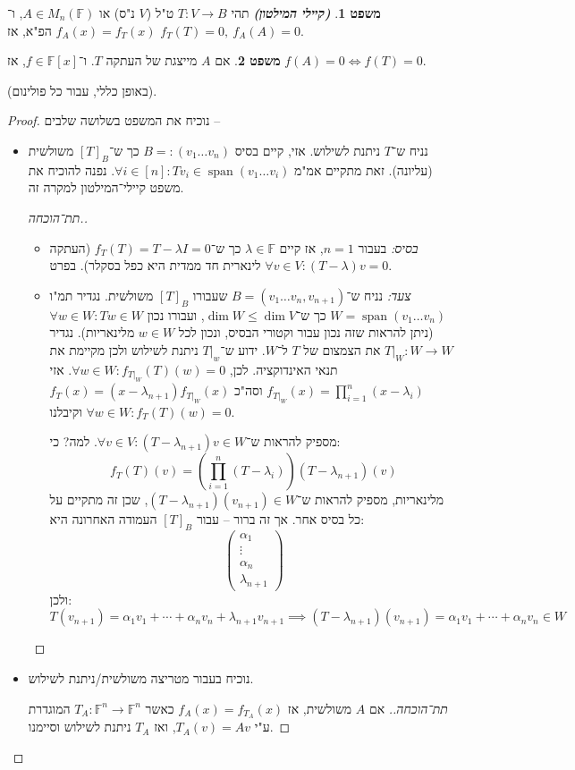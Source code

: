 \documentclass[a4paper]{article}
\DeclareMathOperator{\Sp}      {span}
\newcommand\F         {\mathbb{F}}
\newcommand\co        {\colon}
\newcommand\pms[1]    {\begin{pmatrix}
		#1
\end{pmatrix}}
\newcommand\ag        {\alpha}
\renewcommand\lg      {\lambda}
\newcommand\cl [1]    {\left ( #1 \right )}
\theoremstyle{definition}
\newtheorem{Theorem}{משפט}
\newcommand\theo  [1] {\begin{Theorem}#1\end{Theorem}}
\begin{document}
	\begin{Theorem}
		\textbf{\textit{(קיילי המילטון)}} תהי $T \co V \to B$ ט"ל ($V$ נ"ס) או $A \in M_n(\F)$, ו־$f_A(x) = f_T(x)$ הפ"א, אז $f_T(T) = 0, \ f_A(A) = 0$. 
	\end{Theorem}
	\theo{אם $A$ מייצגת של העתקה $T$. ו־$f \in \F[x]$, אז $f(A) = 0 \iff f(T) = 0$. }
	(באופן כללי, עבור כל פולינום). 
	
	\begin{proof}
		נוכיח את המשפט בשלושה שלבים – 
		\begin{itemize}
			\item נניח ש־$T$ ניתנת לשילוש. אזי, קיים בסיס $B =: (v_1 \dots v_n)$ כך ש־$[T]_B$ משולשית (עליונה). זאת מתקיים אמ"מ $\forall i \in [n] \co Tv_i \in \Sp(v_1 \dots v_i)$. נפנה להוכיח את משפט קיילי־המילטון למקרה זה. 
			
			\begin{proof}[תת־הוכחה.]\,
				\begin{itemize}
					\item \textit{בסיס:} בעבור $n = 1$, אז קיים $\lg \in \F$ כך ש־$f_T(T) = T - \lg I = 0$ (העתקה לינארית חד ממדית היא כפל בסקלר). בפרט $\forall v \in V \co (T - \lg)v = 0$. 
					\item \textit{צעד:} נניח ש־$B = (v_1 \dots v_n, v_{n + 1})$ שעבורו $[T]_B$ משולשית. נגדיר תמ"ו $W = \Sp(v_1 \dots v_n)$ כך ש־$\dim W \le \dim V$, ועבורו נכון $\forall w \in W \co Tw \in W$ (ניתן להראות שזה נכון עבור וקטורי הבסיס, ונכון לכל $w \in W$ מלינאריות). נגדיר $T|_W \co W \to W$ את הצמצום של $T$ ל־$W$. ידוע ש־$T|_w$ ניתנת לשילוש ולכן מקיימת את תנאי האינדוקציה. לכן, $\forall w \in W\co f_{T|_W}(T)(w) = 0$. אזי $f_{T|_W}(x) = \prod_{i = 1}^{n}(x - \lg_i)$ וסה"כ $f_{T}(x) = (x - \lg_{n + 1})f_{T|_W}(x)$ וקיבלנו $\forall w \in W \co f_T(T)(w) = 0$. 
					
					מספיק להראות ש־$\forall v \in V \co (T - \lg_{n + 1})v \in W$. למה? כי: 
					\[ f_T(T)(v) = \cl{\prod_{i = 1}^{n}(T - \lg_i)}(T - \lg_{n + 1})(v) \]
					מלינאריות, מספיק להראות ש־$(T - \lg_{n + 1})(v_{n + 1})\in W$, שכן זה מתקיים על כל בסיס אחר. אך זה ברור – עבור $[T]_B$ העמודה האחרונה היא: 
					\[ \pms{\ag_1 \\ \vdots \\ \ag_n \\ \lg_{n +1}} \]
					ולכן: 
					\[ T(v_{n + 1}) = \ag_1 v_1 + \cdots + \ag_n v_n + \lg_{n + 1} v_{n + 1} \implies (T - \lg_{n + 1})(v_{n + 1}) = \ag_1v_1 + \cdots + \ag_n v_n \in W \]
				\end{itemize}
			\end{proof}
			\item נוכיח בעבור מטריצה משולשית/ניתנת לשילוש. \begin{proof}[תת־הוכחה.]
				אם $A$ משולשית, אז $f_A(x) = f_{T_A}(x)$ כאשר $T_A \co \F^n \to \F^n$ המוגדרת ע"י $T_A(v) = Av$, ואז $T_A$ ניתנת לשילוש וסיימנו. 
				

\end{proof}
\end{itemize}
\end{proof}
\end{document}
